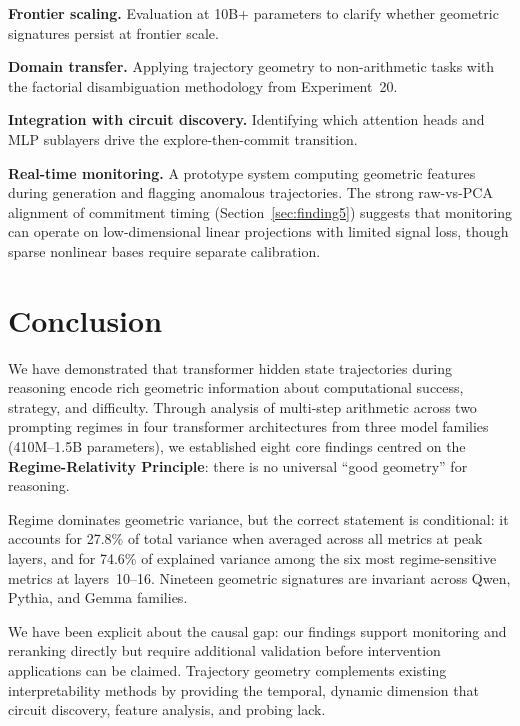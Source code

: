 \documentclass[11pt,twocolumn]{article}
\begin{document}
\textbf{Frontier scaling.} Evaluation at 10B+ parameters to clarify whether geometric signatures persist at frontier scale.

\textbf{Domain transfer.} Applying trajectory geometry to non-arithmetic tasks with the factorial disambiguation methodology from Experiment~20.

\textbf{Integration with circuit discovery.} Identifying which attention heads and MLP sublayers drive the explore-then-commit transition.

\textbf{Real-time monitoring.} A prototype system computing geometric features during generation and flagging anomalous trajectories. The strong raw-vs-PCA alignment of commitment timing (Section~\ref{sec:finding5}) suggests that monitoring can operate on low-dimensional linear projections with limited signal loss, though sparse nonlinear bases require separate calibration.


\section{Conclusion}

We have demonstrated that transformer hidden state trajectories during reasoning encode rich geometric information about computational success, strategy, and difficulty. Through analysis of multi-step arithmetic across two prompting regimes in four transformer architectures from three model families (410M--1.5B parameters), we established eight core findings centred on the \textbf{Regime-Relativity Principle}: there is no universal ``good geometry'' for reasoning.

Regime dominates geometric variance, but the correct statement is conditional: it accounts for 27.8\% of total variance when averaged across all metrics at peak layers, and for 74.6\% of explained variance among the six most regime-sensitive metrics at layers~10--16. Nineteen geometric signatures are invariant across Qwen, Pythia, and Gemma families.

We have been explicit about the causal gap: our findings support monitoring and reranking directly but require additional validation before intervention applications can be claimed. Trajectory geometry complements existing interpretability methods by providing the temporal, dynamic dimension that circuit discovery, feature analysis, and probing lack.
\end{document}
